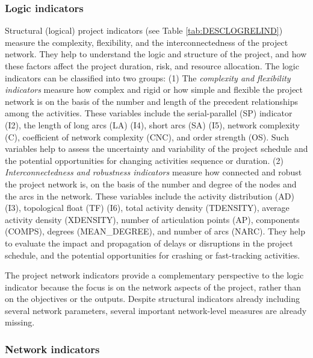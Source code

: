 \documentclass[preprint,
3p]{elsarticle} %
\begin{document}
\subsubsection{Logic indicators}\label{subsubsec:logicindicators}

Structural (logical) project indicators (see Table
\ref{tab:DESCLOGRELIND}) measure the complexity, flexibility, and the
interconnectedness of the project network. They help to understand the
logic and structure of the project, and how these factors affect the
project duration, risk, and resource allocation. The logic indicators
can be classified into two groups: (1) The \emph{complexity and
flexibility indicators} measure how complex and rigid or how simple and
flexible the project network is on the basis of the number and length of
the precedent relationships among the activities. These variables
include the serial-parallel (SP) indicator (I2), the length of long arcs
(LA) (I4), short arcs (SA) (I5), network complexity (C), coefficient of
network complexity (CNC), and order strength (OS). Such variables help
to assess the uncertainty and variability of the project schedule and
the potential opportunities for changing activities sequence or
duration. (2) \emph{Interconnectedness and robustness indicators}
measure how connected and robust the project network is, on the basis of
the number and degree of the nodes and the arcs in the network. These
variables include the activity distribution (AD) (I3), topological float
(TF) (I6), total activity density (TDENSITY), average activity density
(XDENSITY), number of articulation points (AP), components (COMPS),
degrees (MEAN\_DEGREE), and number of arcs (NARC). They help to evaluate
the impact and propagation of delays or disruptions in the project
schedule, and the potential opportunities for crashing or fast-tracking
activities.

The project network indicators provide a complementary perspective to
the logic indicator because the focus is on the network aspects of the
project, rather than on the objectives or the outputs. Despite
structural indicators already including several network parameters,
several important network-level measures are already missing.

\subsubsection{Network indicators}\label{subsubsec:netindicators}
\end{document}
